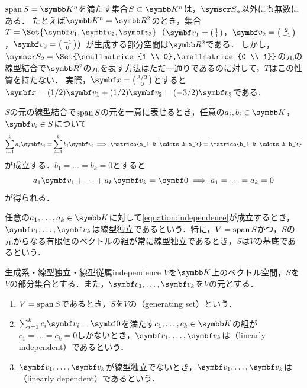 \documentclass[../../main]{subfiles}
\begin{document}
\(\spannedby S=\numset{K}^n\)を満たす集合\(S\subset\numset{K}^n\)は，\(\basis{S}_n\)以外にも無数にある．
たとえば\(\numset{K}^n=\numset{R}^2\)のとき，集合\(T=\Set{\vect{v}_1,\vect{v}_2,\vect{v}_3}\)（\(\vect{v}_1=\smallmatrice{1 \\ 1}\)，\(\vect{v}_2=\smallmatrice{2 \\ -1}\)，\(\vect{v}_3=\smallmatrice{-1 \\ 0}\)）が生成する部分空間は\(\numset{R}^2\)である．
しかし，\(\basis{S}_2=\Set{\smallmatrice{1 \\ 0},\smallmatrice{0 \\ 1}}\)の元の線型結合で\(\numset{R}^2\)の元を表す方法はただ一通りであるのに対して，\(T\)はこの性質を持たない．
実際，\(\vect{x}=\smallmatrice{3/2 \\ 0}\)とすると\(\vect{x}=(1/2)\vect{v}_1+(1/2)\vect{v}_2=(-3/2)\vect{v}_3\)である．

\(S\)の元の線型結合で\(\operatorname{span} S\)の元を一意に表せるとき，任意の\(a_i,b_i\in\numset{K}\)，\(\vect{v}_i\in S\)について
\[
  \sum_{i=1}^ka_i\vect{v}_i = \sum_{i=1}^kb_i\vect{v}_i
  \implies\matrice{a_1 & \cdots & a_k} = \matrice{b_1 & \cdots & b_k}
\]
が成立する．\(b_1=\dots=b_k=0\)とすると
\begin{equation}
  \label{equation:independence}
  a_1\vect{v}_1+\dots+a_k\vect{v}_k = \zvec
  \implies a_1 = \dots = a_k = 0
\end{equation}
が得られる．

任意の\(a_1,\dots,a_k\in\numset{K}\)に対して\cref{equation:independence}が成立するとき，
\(\vect{v}_1,\dots,\vect{v}_k\)は線型独立であるという．特に，\(V=\operatorname{span} S\)かつ，\(S\)の元からなる有限個のベクトルの組が常に線型独立であるとき，\(S\)は\(V\)の基底であるという．

\begin{definition}{生成系・線型独立・線型従属}{independence}
  \(V\)を\(\numset{K}\)上のベクトル空間，\(S\)を\(V\)の部分集合とする．また，\(\vect{v}_1,\dots,\vect{v}_k\)を\(V\)の元とする．
  \begin{enumerate}
    \item \(V=\operatorname{span} S\)であるとき，\(S\)を\(V\)の（generating set）という．
    \item \(\sum_{i=1}^kc_i\vect{v}_i=\zvec\)を満たす\(c_1,\dots,c_k\in\numset{K}\)の組が\(c_1=\dots=c_k=0\)しかないとき，\(\vect{v}_1,\dots,\vect{v}_k\)は（linearly independent）であるという．
    \item \(\vect{v}_1,\dots,\vect{v}_k\)が線型独立でないとき，\(\vect{v}_1,\dots,\vect{v}_k\)は（linearly dependent）であるという．
  \end{enumerate}
\end{definition}
\end{document}
